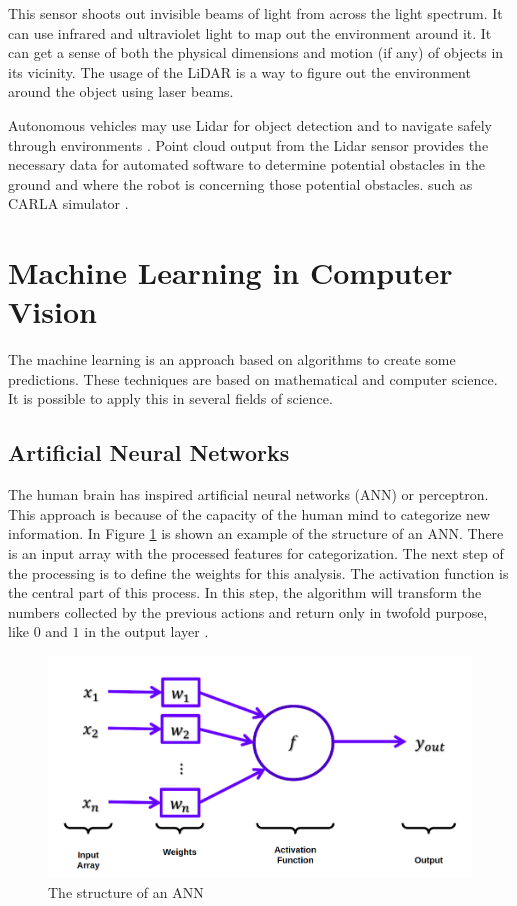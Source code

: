 This sensor shoots out invisible beams of light from across the light spectrum. It can use infrared and ultraviolet light to map out the environment around it. It can get a sense of both the physical dimensions and motion (if any) of objects in its vicinity. The usage of the LiDAR is a way to figure out the environment around the object using laser beams.  

Autonomous vehicles may use Lidar for object detection and to navigate safely through environments \cite{Lim2019}. Point cloud output from the Lidar sensor provides the necessary data for automated software to determine potential obstacles in the ground and where the robot is concerning those potential obstacles.  such as CARLA simulator \cite{dosovitskiy2017carla}\cite{dworak2019performance}.

\section{Machine Learning in Computer Vision}\label{ml-ai}
The machine learning is an approach based on algorithms to create some predictions. These techniques are based on mathematical and computer science. It is possible to apply this in several fields of science. 
\subsection{Artificial Neural Networks}

The human brain has inspired artificial neural networks (ANN) or perceptron. This approach is because of the capacity of the human mind to categorize new information. In Figure \ref{fig:ann} is shown an example of the structure of an ANN. There is an input array with the processed features for categorization. The next step of the processing is to define the weights for this analysis. The activation function is the central part of this process. In this step, the algorithm will transform the numbers collected by the previous actions and return only in twofold purpose, like $0$ and $1$ in the output layer \cite{goodfellow2016deep}.

\begin{figure}[H]
\centering
\includegraphics[width=\columnwidth]{imagens/ann.png}
\caption{The structure of an ANN \cite{lecture}}
\label{fig:ann}
\end{figure}

